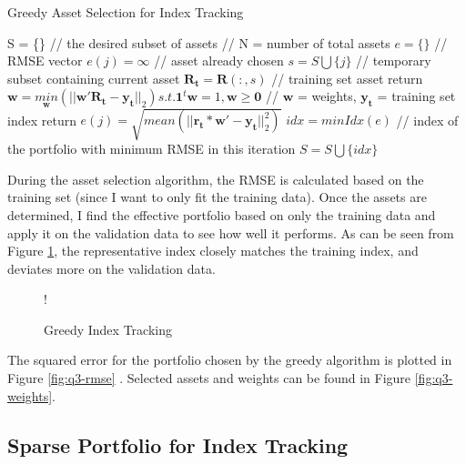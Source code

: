 \documentclass[11pt]{article}
\begin{document}
\begin{algorithm}[H]
\caption{Greedy Asset Selection for Index Tracking}
\label{alg:greedy-index}
\begin{algorithmic}
\State S = \{\} // the desired subset of assets
 // N = number of total assets
\State $e = \{\}$ // RMSE vector
\State $e(j) = \infty$ // asset already chosen
\Else
\State $s = S \bigcup \{j\}$ // temporary subset containing current asset
\State $\bm{R_t} = \bm{R}(:, s)$ // training set asset return
\State $\bm{w} = \underset{\bm{w}}{min}(||\bm{w}'\bm{R_t} - \bm{y_t}||_2) s.t. \bm{1}^t\bm{w} = 1, \bm{w} \geq \bm{0}$ // $\bm{w}$ = weights, $\bm{y_t}$ = training set index return
\State $e(j) = \sqrt{mean(||\bm{r_t} * \bm{w}' - \bm{y_t}||_2^2)}$
\EndIf
\EndFor
\State $idx = minIdx(e)$ // index of the portfolio with minimum RMSE in this iteration
\State $S = S \bigcup \{idx\}$
\EndFor
\end{algorithmic}
\end{algorithm}

During the asset selection algorithm, the RMSE is calculated based on the training set (since I want to only fit the
training data). Once the assets are determined, I find the effective portfolio based on only the training data and 
apply it on the validation data to see how well it performs. As can be seen from Figure \ref{fig:q3-greedy},
the representative index closely matches the training index, and deviates more on the validation data.

\begin{figure}[!h]
	\vspace{-0.5cm}
   \centering 
 	 {!} { }
    \caption{Greedy Index Tracking}
	\label{fig:q3-greedy}
	\vspace{-0.5cm}
\end{figure}

The squared error for the portfolio chosen by the greedy algorithm is plotted in Figure \ref{fig:q3-rmse} . Selected assets and weights can be found in Figure \ref{fig:q3-weights}.

\subsection{Sparse Portfolio for Index Tracking}
\end{document}
